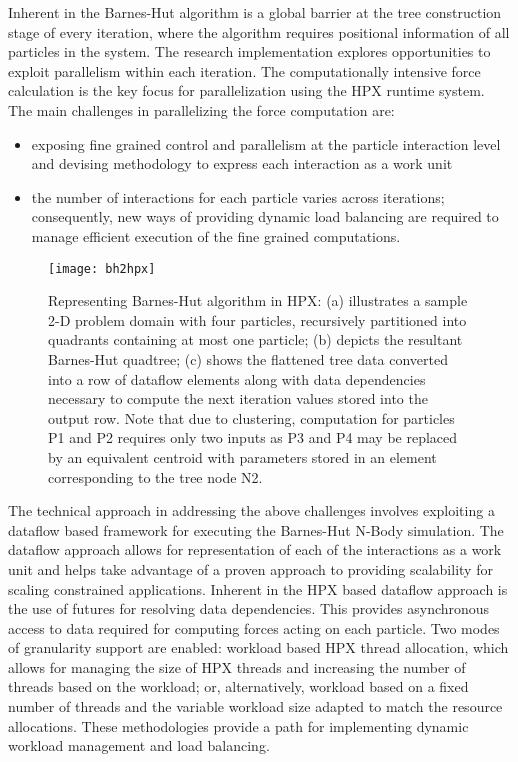 \documentclass[floatfix]{revtex4}
\begin{document}
Inherent in the Barnes-Hut algorithm is a global barrier at the tree construction stage 
of every iteration, where
the algorithm requires positional information of all particles in the system. The research implementation
explores opportunities to exploit parallelism within each iteration. The computationally intensive force
calculation is the key focus for parallelization using the HPX runtime system. The main challenges in
parallelizing the force computation are:
\begin{itemize}
 \item exposing fine grained control and parallelism at the particle interaction level and devising methodology
to express each interaction as a work unit
 \item the number of interactions for each particle varies across iterations; consequently, new ways of
providing dynamic load balancing are required to manage efficient execution of the fine grained computations.
\end{itemize}

\begin{figure}[htp]
\centering
\texttt{[image: bh2hpx]}
\caption{Representing Barnes-Hut algorithm in HPX:
(a) illustrates a sample 2-D problem domain with four particles, recursively
partitioned into quadrants containing at most one particle;
(b) depicts the resultant Barnes-Hut quadtree;
(c) shows the flattened tree data converted into a row of dataflow elements 
along with data dependencies necessary to compute the next iteration values
stored into the output row.
Note that due to clustering, computation for particles P1 and P2 requires 
only two inputs as P3 and P4 may be replaced by an equivalent centroid with
parameters stored in an element corresponding to the tree node N2.}
\label{bh2hpx}
\end{figure}

The technical approach in addressing the above challenges involves exploiting a dataflow based framework for
executing the Barnes-Hut N-Body simulation. 
The dataflow approach allows for representation of each of the interactions
as a work unit and helps take advantage of a proven approach to providing scalability for scaling constrained
applications. Inherent in the HPX based dataflow approach is the use of futures for resolving data dependencies.
This provides asynchronous access to data required for computing forces
acting on each particle. Two modes of granularity
support are enabled: workload based HPX thread allocation, which allows for managing the size of HPX threads and
increasing the number of threads based on the workload; or, alternatively, workload based on a fixed number of 
threads and the variable workload size adapted to match the resource
allocations. These methodologies provide a path for implementing dynamic workload management and load balancing.
\end{document}
